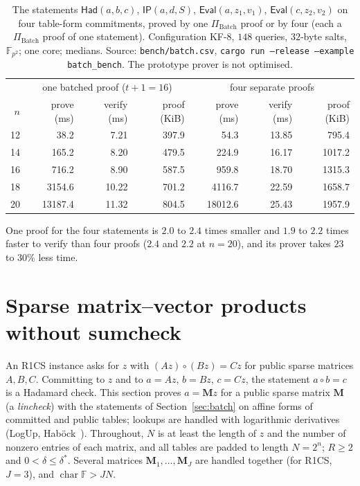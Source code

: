 \documentclass[11pt]{article}
\theoremstyle{definition}
\newcommand{\F}{\mathbb{F}}
\begin{document}
\begin{table}[h]
\centering\small
\setlength{\tabcolsep}{5pt}
\begin{tabular}{r rrr rrr}
\hline
& \multicolumn{3}{c}{one batched proof ($t+1=16$)} & \multicolumn{3}{c}{four separate proofs}\\
$n$ & prove (ms) & verify (ms) & proof (KiB) & prove (ms) & verify (ms) & proof (KiB)\\
\hline
12 & 38.2 & 7.21 & 397.9 & 54.3 & 13.85 & 795.4\\
14 & 165.2 & 8.20 & 479.5 & 224.9 & 16.17 & 1017.2\\
16 & 716.2 & 8.90 & 587.5 & 959.8 & 18.70 & 1315.3\\
18 & 3154.6 & 10.22 & 701.2 & 4116.7 & 22.59 & 1658.7\\
20 & 13187.4 & 11.32 & 804.5 & 18012.6 & 25.43 & 1957.9\\
\hline
\end{tabular}
\caption{The statements $\mathsf{Had}(a,b,c)$, $\mathsf{IP}(a,d,S)$, $\mathsf{Eval}(a,z_1,v_1)$, $\mathsf{Eval}(c,z_2,v_2)$ on four table-form commitments, proved by one $\Pi_{\mathrm{Batch}}$ proof or by four (each a $\Pi_{\mathrm{Batch}}$ proof of one statement). Configuration KF-8, $148$ queries, $32$-byte salts, $\F_{p^2}$; one core; medians. Source: \texttt{bench/batch.csv}, \texttt{cargo run --release --example batch\_bench}. The prototype prover is not optimised.}
\end{table}
One proof for the four statements is $2.0$ to $2.4$ times smaller and $1.9$ to $2.2$ times faster to verify than four proofs ($2.4$ and $2.2$ at $n=20$), and its prover takes $23$ to $30\%$ less time.

\section{Sparse matrix--vector products without sumcheck}\label{sec:lin}

An R1CS instance asks for $z$ with $(Az)\circ(Bz)=Cz$ for public sparse matrices $A,B,C$.
Committing to $z$ and to $a=Az$, $b=Bz$, $c=Cz$, the statement $a\circ b=c$ is a Hadamard check.
This section proves $a=\mathbf Mz$ for a public sparse matrix $\mathbf M$ (a \emph{lincheck}) with the statements of Section~\ref{sec:batch} on affine forms of committed and public tables; lookups are handled with logarithmic derivatives (LogUp, Hab\"ock~\cite{Hab22}).
Throughout, $N$ is at least the length of $z$ and the number of nonzero entries of each matrix, and all tables are padded to length $N=2^n$; $R\ge2$ and $0<\delta\le\delta^\ast$. Several matrices $\mathbf M_1,\dots,\mathbf M_J$ are handled together (for R1CS, $J=3$), and $\operatorname{char}\F>JN$.
\end{document}
